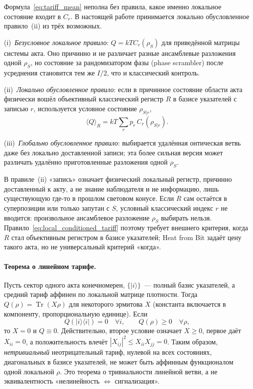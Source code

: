 \documentclass[11pt,a4paper]{article}
\begin{document}
Формула~\eqref{eq:tariff_mean} неполна без правила, какое именно локальное состояние входит в $C_r$. В настоящей работе принимается локально обусловленное правило~(ii) из трёх возможных.

(i)~\emph{Безусловное локальное правило}: $Q=kT C_r(\rho_S)$ для приведённой матрицы системы акта. Оно причинно и не различает разные ансамблевые разложения одной $\rho_S$, но состояние за рандомизатором фазы (phase scrambler) после усреднения становится тем же $I/2$, что и классический контроль.

(ii)~\emph{Локально обусловленное правило}: если в причинное состояние области акта физически вошёл объективный классический регистр $R$ в базисе указателей с записью $r$, используется условное состояние $\rho_{S|r}$,
\begin{equation}
\langle Q\rangle_R=kT\sum_r p_r\,C_r(\rho_{S|r}).
\label{eq:local_conditioned_tariff}
\end{equation}

(iii)~\emph{Глобально обусловленное правило}: выбирается удалённая онтическая ветвь даже без локально доставленной записи; эта более сильная версия может различать удалённо приготовленные разложения одной $\rho_S$.

В правиле~(ii) «запись» означает физический локальный регистр, причинно доставленный к акту, а не знание наблюдателя и не информацию, лишь существующую где-то в прошлом световом конусе. Если $R$ сам остаётся в суперпозиции или только запутан с $S$, условный классический индекс $r$ не вводится: произвольное ансамблевое разложение $\rho_S$ выбирать нельзя. Правило~\eqref{eq:local_conditioned_tariff} поэтому требует внешнего критерия, когда $R$ стал объективным регистром в базисе указателей; Heat from Bit задаёт цену такого акта, но не универсальный критерий «когда».

\paragraph{Теорема о линейном тарифе.}
Пусть сектор одного акта конечномерен, $\{|i\rangle\}$~--- полный базис указателей, а средний тариф аффинен по локальной матрице плотности. Тогда $Q(\rho)=\operatorname{Tr}(X\rho)$ для некоторого эрмитова $X$ (константа включается в компоненту, пропорциональную единице). Если
\begin{equation}
Q(|i\rangle\langle i|)=0\quad\forall i,
\qquad
Q(\rho)\ge0\quad\forall\rho,
\label{eq:linear_tariff_conditions}
\end{equation}
то $X=0$ и $Q\equiv0$. Действительно, второе условие означает $X\ge0$, первое даёт $X_{ii}=0$, а положительность влечёт $|X_{ij}|^2\le X_{ii}X_{jj}=0$. Таким образом, \emph{нетривиальный} неотрицательный тариф, нулевой на всех состояниях, диагональных в базисе указателей, не может быть аффинным функционалом одной локальной $\rho$. Это теорема о тривиальности линейной ветви, а не эквивалентность «нелинейность $\Leftrightarrow$ сигнализация».
\end{document}
